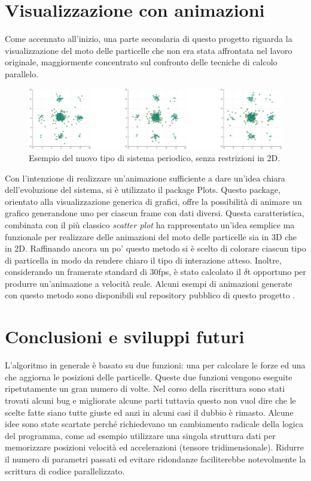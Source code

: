 \documentclass[11pt, a4paper]{article}
\begin{document}
\section{Visualizzazione con animazioni}
Come accennato all'inizio, una parte secondaria di questo progetto riguarda la visualizzazione del moto delle particelle che non era stata affrontata nel lavoro originale, maggiormente concentrato sul confronto delle tecniche di calcolo parallelo. 
\begin{figure}[ht]
\centering
\includegraphics[width=\textwidth]{images/spritesheet2d.png}
\caption{Esempio del nuovo tipo di sistema periodico, senza restrizioni in 2D.}
\label{sprite2d}
\end{figure}
Con l'intenzione di realizzare un'animazione sufficiente a dare un'idea chiara dell'evoluzione del sistema, si è utilizzato il package Plots. Questo package, orientato alla visualizzazione generica di grafici, offre la possibilità di animare un grafico generandone uno per ciascun frame con dati diversi. Questa caratteristica, combinata con il più classico \emph{scatter plot} ha rappresentato un'idea semplice ma funzionale per realizzare delle animazioni del moto delle particelle sia in 3D che in 2D. Raffinando ancora un po' questo metodo si è scelto di colorare ciascun tipo di particella in modo da rendere chiaro il tipo di interazione atteso.
Inoltre, considerando un framerate standard di 30fps, è stato calcolato il $\delta$t opportuno per produrre un'animazione a velocità reale.
Alcuni esempi di animazioni generate con questo metodo sono disponibili sul repository pubblico di questo progetto \cite{myself}.

\section*{Conclusioni e sviluppi futuri}
L'algoritmo in generale è basato su due funzioni: una per calcolare le forze ed una che aggiorna le posizioni delle particelle. Queste due funzioni vengono eseguite ripetutamente un gran numero di volte. Nel corso della riscrittura sono stati trovati alcuni bug e migliorate alcune parti tuttavia questo non vuol dire che le scelte fatte siano tutte giuste ed anzi in alcuni casi il dubbio è rimasto. Alcune idee sono state scartate perché richiedevano un cambiamento radicale della logica del programma, come ad esempio utilizzare una singola struttura dati per memorizzare posizioni velocità ed accelerazioni (tensore tridimensionale). Ridurre il numero di parametri passati ed evitare ridondanze faciliterebbe notevolmente la scrittura di codice parallelizzato.
\end{document}
